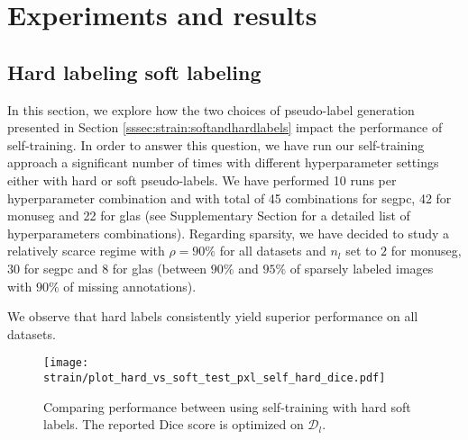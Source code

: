 
\section{Experiments and results}
\label{sec:strain:results}

\subsection{Hard labeling \vs soft labeling}
\label{ssec:strain:res:hardvssoft}

In this section, we explore how the two choices of pseudo-label generation presented in Section \ref{sssec:strain:softandhardlabels} impact the performance of self-training. In order to answer this question, we have run our self-training approach a significant number of times with different hyperparameter settings either with hard or soft pseudo-labels. We have performed 10 runs per hyperparameter combination and with total of 45 combinations for \acrshort{segpc}, 42 for \acrshort{monuseg} and 22 for \acrshort{glas} (see Supplementary Section  for a detailed list of hyperparameters combinations). Regarding sparsity, we have decided to study a relatively scarce regime with $\rho = 90\%$ for all datasets and $n_l$ set to $2$ for \acrshort{monuseg}, $30$ for \acrshort{segpc} and $8$ for \acrshort{glas} (\ie between $90\%$ and $95\%$ of sparsely labeled images with $90\%$ of missing annotations).    

We observe that hard labels consistently yield superior performance on all datasets. 

\begin{figure}
  \centering
  \texttt{[image: strain/plot\_hard\_vs\_soft\_test\_pxl\_self\_hard\_dice.pdf]}
  \caption{Comparing performance between using self-training with hard \vs soft labels. The reported Dice score is optimized on $\mathcal{D}_l$.}
  \label{fig:strain:hard_vs_soft}
\end{figure}

